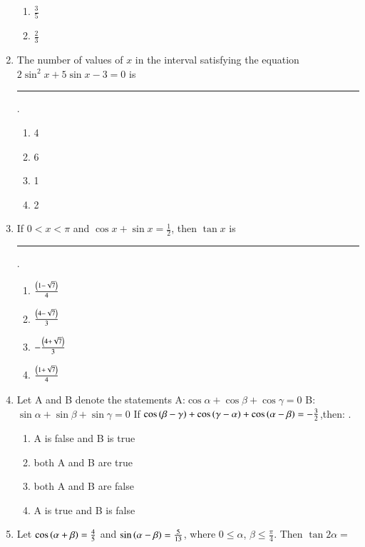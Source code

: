 \begin{enumerate}[label=\thesubsection.\arabic*,ref=\thesubsection.\theenumi]
\begin{multicols}{2}
\begin{enumerate}
\item $\frac{3}{5}$
\item $\frac{2}{3}$
\end{enumerate} 
\end{multicols}
\item The number of values of $x$ in the interval  satisfying the equation 
%
$2\sin^2 x+5\sin x-3=0$  is \rule{1cm}{0.1pt}. \hfill{}
\begin{multicols}{4}
\begin{enumerate}
\item 4
\columnbreak
\item 6
\columnbreak
\item 1
\columnbreak
\item 2
\end{enumerate} 
\end{multicols}
\item If $0<x<\pi$ and $\cos x+\sin x=\frac{1}{2}$, then $\tan x$  is \rule{1cm}{0.1pt}. 
\hfill{}
\begin{multicols}{2} 
\begin{enumerate}
\item $\frac{\left(1-\sqrt{7}\right)}{4}$
\item $\frac{\left(4-\sqrt{7}\right)}{3}$
\columnbreak
\item $-\frac{\left(4+\sqrt{7}\right)}{3}$
\item $\frac{\left(1+\sqrt{7}\right)}{4}$
\end{enumerate} 
\end{multicols}
\item Let {A} and {B} denote the statements
 {A}:$\cos\alpha+\cos\beta+\cos\gamma=0$
 {B}:$\sin\alpha+\sin\beta+\sin\gamma=0$
If $\cos\left(\beta-\gamma\right)+\cos\left(\gamma-\alpha\right)+\cos\left(\alpha-\beta\right)=-\frac{3}{2}$,then:
.\hfill{}
\begin{enumerate}
\item {A} is false and {B} is true 
\item both {A} and {B} are true
\item both {A} and {B} are false 
\item {A} is true and {B} is false
\end{enumerate}
\item Let $\cos\left(\alpha+\beta\right)=\frac{4}{5}$  and $\sin\left(\alpha-\beta\right)=\frac{5}{13}$, where $0\le\alpha$, $\beta\le\frac{\pi}{4}$. Then $\tan2\alpha=$ \hfill{}
\begin{multicols}{4}
\begin{enumerate}

\end{enumerate}
\end{multicols}
\end{enumerate}
